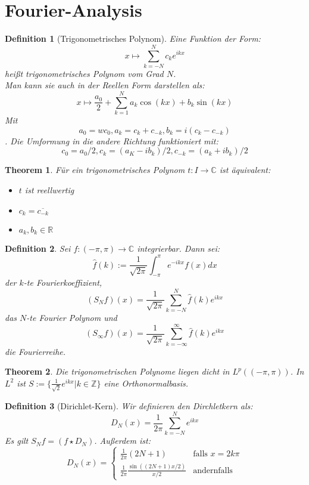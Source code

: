 \documentclass[10pt,a4paper]{article}
\newtheorem{theorem}{Theorem}
\newtheorem{definition}{Definition}
\begin{document}
\section{Fourier-Analysis}
\begin{definition}[Trigonometrisches Polynom]
	Eine Funktion der Form:
	$$x \mapsto \sum_{k=-N}^{N}c_ke^{ikx}$$
	heißt trigonometrisches Polynom vom Grad $N$.\\
	Man kann sie auch in der Reellen Form darstellen als:
	$$x \mapsto \frac{a_0}{2} + \sum_{k=1}^{N} a_k \cos(kx)+b_k\sin(kx)$$
	Mit $$a_0 = wc_0, a_k = c_k +c_{-k}, b_k = i(c_k -c_{-k})$$.
	Die Umformung in die andere Richtung funktioniert mit:
	$$c_0 = a_0/2, c_k = (a_K -ib_k)/2, c_{-k} = (a_k +ib_k)/2$$
\end{definition}
\begin{theorem}
	Für ein trigonometrisches Polynom $t: I \to \mathbb{C}$ ist äquivalent:
	\begin{itemize}
		\item $t$ ist reellwertig
		\item $c_k = \overline{c_{-k}}$
		\item $a_k, b_k\in \mathbb{R}$
	\end{itemize}
\end{theorem}
\begin{definition}
	Sei $f: (-\pi, \pi) \to \mathbb{C}$ integrierbar. Dann sei:
	$$\hat{f}(k) := \frac{1}{\sqrt{2\pi}}\int_{-\pi}^{\pi}e^{-ikx}f(x)dx$$
	der $k$-te Fourierkoeffizient,
	$$(S_Nf)(x) = \frac{1}{\sqrt{2\pi}}\sum_{k=-N}^{N}\hat{f}(k)e^{ikx}$$
	das $N$-te Fourier Polynom und
	$$(S_\infty f)(x) = \frac{1}{\sqrt{2\pi}}\sum_{k=-\infty}^{\infty}\hat{f}(k)e^{ikx}$$
	die Fourierreihe.
\end{definition}
\begin{theorem}
	Die trigonometrischen Polynome liegen dicht in $L^p((-\pi, \pi))$. In $L^2$ ist $S:= \{\frac{1}{\sqrt{2}}e^{ikx}| k \in \mathbb{Z}\}$ eine Orthonormalbasis.
\end{theorem}
\begin{definition}[Dirichlet-Kern]
	Wir definieren den Dirchletkern als:
	$$D_N(x) = \frac{1}{2\pi}\sum_{k=-N}^{N}e^{ikx}$$
	Es gilt $S_Nf = (f\star D_N)$.
	Außerdem ist:
	$$D_N(x) = \begin{cases}
		\frac{1}{2\pi}(2N+1) & \text{falls } x= 2k\pi\\
		\frac{1}{2\pi}\frac{\sin((2N+1)x/2)}{x/2} & \text{andernfalls}
	\end{cases}$$
\end{definition}
\end{document}
